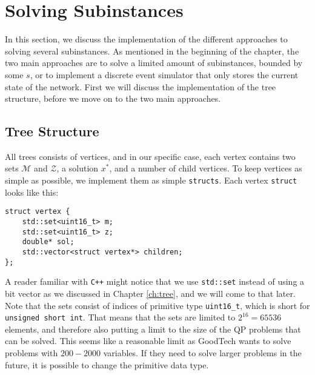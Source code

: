 \section{Solving Subinstances}
In this section, we discuss the implementation of the different approaches to
solving several subinstances.
As mentioned in the beginning of the chapter, the two
main approaches are to solve a limited amount of subinstances, bounded
by some $s$, or to implement a discrete event simulator that only stores
the current state of the network. First we will discuss the implementation
of the tree structure, before we move on to the two main approaches.

\subsection{Tree Structure}
All trees consists of vertices, and in our specific case, each vertex contains
two sets $\mathcal{M}$ and $\mathcal{Z}$, a solution $x^*$, and a number of
child vertices. To keep vertices as simple as possible, we implement them as
simple \texttt{structs}. Each vertex \texttt{struct} looks like
this:
\begin{verbatim}
struct vertex {
    std::set<uint16_t> m;
    std::set<uint16_t> z;
    double* sol;
    std::vector<struct vertex*> children;
};
\end{verbatim}
A reader familiar with \texttt{C++} might notice that we use
\texttt{std::set} instead of using a bit vector as we discussed
in Chapter \ref{ch:tree}, and we will come to that later. Note that
the sets consist of indices of primitive type \texttt{uint16\_t}, which is
short for \texttt{unsigned short int}. That means that the sets are limited to
$2^{16} = 65536$ elements, and therefore also putting a limit to the size
of the QP problems that can be solved. This seems like a reasonable limit
as GoodTech wants to solve problems with $200 - 2000$ variables.
If they need to solve larger problems in the future, it is possible to change
the primitive data type.

